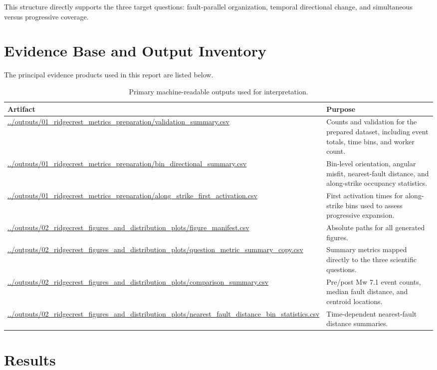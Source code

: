 \documentclass[11pt]{article}
\begin{document}
This structure directly supports the three target questions: fault-parallel organization, temporal directional change, and simultaneous versus progressive coverage.

\section{Evidence Base and Output Inventory}
The principal evidence products used in this report are listed below.

\begin{table}[H]
\centering
\caption{Primary machine-readable outputs used for interpretation.}
\begin{tabularx}{\textwidth}{>{\raggedright\arraybackslash}p{}X}
\toprule
Artifact & Purpose \\
\midrule
\url{../outputs/01_ridgecrest_metrics_preparation/validation_summary.csv} & Counts and validation for the prepared dataset, including event totals, time bins, and worker count. \\
\url{../outputs/01_ridgecrest_metrics_preparation/bin_directional_summary.csv} & Bin-level orientation, angular misfit, nearest-fault distance, and along-strike occupancy statistics. \\
\url{../outputs/01_ridgecrest_metrics_preparation/along_strike_first_activation.csv} & First activation times for along-strike bins used to assess progressive expansion. \\
\url{../outputs/02_ridgecrest_figures_and_distribution_plots/figure_manifest.csv} & Absolute paths for all generated figures. \\
\url{../outputs/02_ridgecrest_figures_and_distribution_plots/question_metric_summary_copy.csv} & Summary metrics mapped directly to the three scientific questions. \\
\url{../outputs/02_ridgecrest_figures_and_distribution_plots/comparison_summary.csv} & Pre/post Mw 7.1 event counts, median fault distance, and centroid locations. \\
\url{../outputs/02_ridgecrest_figures_and_distribution_plots/nearest_fault_distance_bin_statistics.csv} & Time-dependent nearest-fault distance summaries. \\
\bottomrule
\end{tabularx}
\end{table}

\section{Results}
\end{document}
